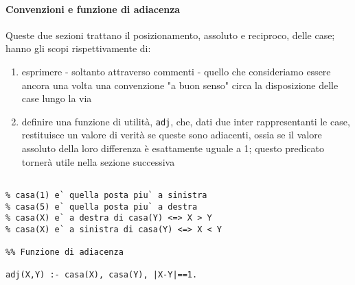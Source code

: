 \paragraph{Convenzioni e funzione di adiacenza}
Queste due sezioni trattano il posizionamento, assoluto e reciproco, delle case; hanno gli scopi rispettivamente di: \begin{enumerate} \item{esprimere - soltanto attraverso commenti - quello che consideriamo essere ancora una volta una convenzione "a buon senso" circa la disposizione delle case lungo la via} \item{definire una funzione di utilità, \texttt{adj}, che, dati due inter rappresentanti le case, restituisce un valore di verità se queste sono adiacenti, ossia se il valore assoluto della loro differenza è esattamente uguale a 1; questo predicato tornerà utile nella sezione successiva} \end{enumerate}
\begin{lstlisting}[frame=tb]
%% Convenzioni

% casa(1) e` quella posta piu` a sinistra
% casa(5) e` quella posta piu` a destra
% casa(X) e` a destra di casa(Y) <=> X > Y
% casa(X) e` a sinistra di casa(Y) <=> X < Y

%% Funzione di adiacenza

adj(X,Y) :- casa(X), casa(Y), |X-Y|==1.
\end{lstlisting}
